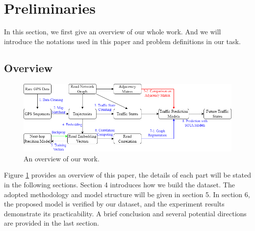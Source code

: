 
\section{Preliminaries}
In this section, we first give an overview of our whole work. And we will introduce the notations used in this paper and problem definitions in our task.

\subsection{Overview}
\begin{figure}[htb]
    \centering
    \includegraphics[width=\textwidth]{images/overview.drawio.png}
    \caption{An overview of our work.}
    \label{fig: overview}
\end{figure}

Figure \ref{fig: overview} provides an overview of this paper, the details of each part will be stated in the following sections. Section 4 introduces how we build the dataset. The adopted methodology and model structure will be given in section 5. In section 6, the proposed model is verified by our dataset, and the experiment results demonstrate its practicability. A brief conclusion and several potential directions are provided in the last section.

